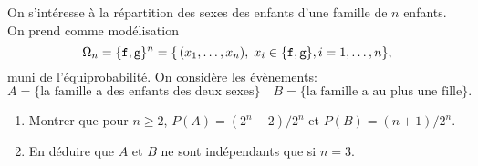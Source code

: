 \documentclass[a4paper,12pt,reqno]{amsart}
\begin{document}
\begin{exo}

  On s'intéresse à la répartition des sexes des enfants d'une famille de
  $n$ enfants. On prend comme modélisation
    $$
      \Omega_n=\{{\tt f},{\tt g}\}^n=\{\,(x_1,\ldots,x_n),\; x_i\in\{{\tt f},{\tt g}\}, i=1,\dots,n\},
    $$
  muni de l'équiprobabilité. On considère les évènements:
    $$
      A=\{\text{la famille a des enfants des deux sexes}\}\quad
      B=\{\text{la famille a au plus une fille}\}.
    $$

  \begin{enumerate}
    \item  Montrer que pour $n\geq 2$, $P(A)=(2^n-2)/2^n$ et $P(B)=(n+1)/2^n$.
    \item  En déduire que $A$ et $B$ ne sont indépendants que si $n=3$.
  \end{enumerate}

 \end{exo}
\end{document}
